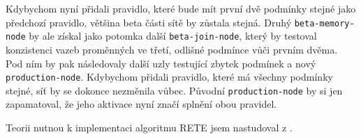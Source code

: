 Kdybychom nyní přidali pravidlo, které bude mít první dvě podmínky stejné jako
předchozí pravidlo, většina beta části sítě by zůstala stejná. Druhý
\verb|beta-memory-node| by ale získal jako potomka další \verb|beta-join-node|,
který by testoval konzistenci vazeb proměnných ve třetí, odlišné podmínce vůči
prvním dvěma. Pod ním by pak následovaly další uzly testující zbytek podmínek a
nový \verb|production-node|. Kdybychom přidali pravidlo, které má všechny
podmínky stejné, síť by se dokonce nezměnila vůbec. Původní
\verb|production-node| by si jen zapamatoval, že jeho aktivace nyní značí splnění
obou pravidel.

Teorii nutnou k implementaci algoritmu RETE jsem nastudoval z \cite{doorenbos}.

